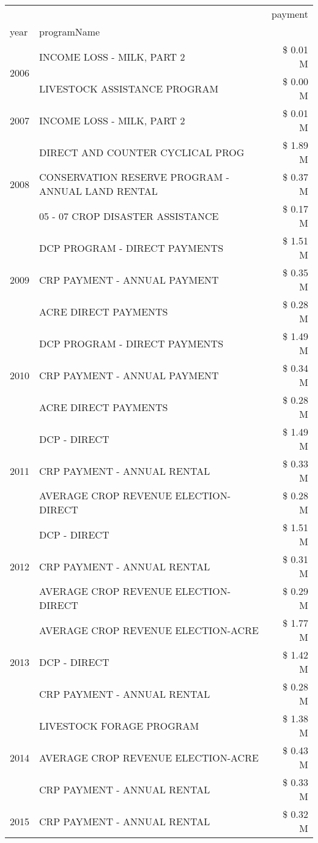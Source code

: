 \begin{tabular}{llr}
\toprule
 &  & payment \\
year & programName &  \\
\midrule
\multirow[t]{2}{*}{2006} & INCOME LOSS - MILK, PART 2 & \$ 0.01 M \\
 & LIVESTOCK ASSISTANCE PROGRAM & \$ 0.00 M \\
\cline{1-3}
2007 & INCOME LOSS - MILK, PART 2 & \$ 0.01 M \\
\cline{1-3}
\multirow[t]{3}{*}{2008} & DIRECT AND COUNTER CYCLICAL PROG & \$ 1.89 M \\
 & CONSERVATION RESERVE PROGRAM - ANNUAL LAND RENTAL & \$ 0.37 M \\
 & 05 - 07 CROP DISASTER ASSISTANCE & \$ 0.17 M \\
\cline{1-3}
\multirow[t]{3}{*}{2009} & DCP PROGRAM - DIRECT PAYMENTS & \$ 1.51 M \\
 & CRP PAYMENT - ANNUAL PAYMENT & \$ 0.35 M \\
 & ACRE DIRECT PAYMENTS & \$ 0.28 M \\
\cline{1-3}
\multirow[t]{3}{*}{2010} & DCP PROGRAM - DIRECT PAYMENTS & \$ 1.49 M \\
 & CRP PAYMENT - ANNUAL PAYMENT & \$ 0.34 M \\
 & ACRE DIRECT PAYMENTS & \$ 0.28 M \\
\cline{1-3}
\multirow[t]{3}{*}{2011} & DCP - DIRECT & \$ 1.49 M \\
 & CRP PAYMENT - ANNUAL RENTAL & \$ 0.33 M \\
 & AVERAGE CROP REVENUE ELECTION-DIRECT & \$ 0.28 M \\
\cline{1-3}
\multirow[t]{3}{*}{2012} & DCP - DIRECT & \$ 1.51 M \\
 & CRP PAYMENT - ANNUAL RENTAL & \$ 0.31 M \\
 & AVERAGE CROP REVENUE ELECTION-DIRECT & \$ 0.29 M \\
\cline{1-3}
\multirow[t]{3}{*}{2013} & AVERAGE CROP REVENUE ELECTION-ACRE & \$ 1.77 M \\
 & DCP - DIRECT & \$ 1.42 M \\
 & CRP PAYMENT - ANNUAL RENTAL & \$ 0.28 M \\
\cline{1-3}
\multirow[t]{3}{*}{2014} & LIVESTOCK FORAGE PROGRAM & \$ 1.38 M \\
 & AVERAGE CROP REVENUE ELECTION-ACRE & \$ 0.43 M \\
 & CRP PAYMENT - ANNUAL RENTAL & \$ 0.33 M \\
\cline{1-3}
\multirow[t]{3}{*}{2015} & CRP PAYMENT - ANNUAL RENTAL & \$ 0.32 M \\

\end{tabular}
